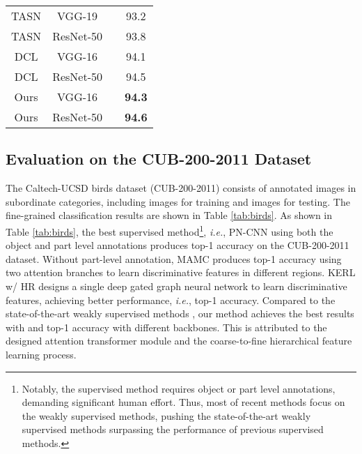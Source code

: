 \documentclass[10pt,twocolumn,letterpaper]{article}
\def\ie{{\em i.e.}}
\begin{document}
\begin{table}[t]
{\begin{tabular}{cccc}
    	 TASN \cite{DBLP:journals/corr/abs-1903-06150}  &    VGG-19    &    &      93.2       \\
    	 TASN \cite{DBLP:journals/corr/abs-1903-06150}  &  ResNet-50   &    &      93.8       \\
    	           DCL \cite{Chen_2019_CVPR}            &    VGG-16    &    &      94.1       \\
    	           DCL \cite{Chen_2019_CVPR}            &  ResNet-50   &    &      94.5       \\
	           \hline
    	                     Ours                       &    VGG-16    &    &  \textbf{94.3}  \\
    	                     Ours                       &  ResNet-50   &    &  \textbf{94.6}  \\ \bottomrule
    \end{tabular}}
\end{table}


\subsection{Evaluation on the CUB-200-2011 Dataset}
The Caltech-UCSD birds dataset (CUB-200-2011) \cite{report-wahcub_200_2011} consists of  annotated images in  subordinate categories, including  images for training and  images for testing. The fine-grained classification results are shown in Table \ref{tab:birds}. As shown in Table \ref{tab:birds}, the best supervised method\footnote{Notably, the supervised method requires object or part level annotations, demanding significant human effort. Thus, most of recent methods focus on the weakly supervised methods, pushing the state-of-the-art weakly supervised methods surpassing the performance of previous supervised methods.}, \ie, PN-CNN \cite{DBLP:journals/corr/BransonHBP14} using both the object and part level annotations produces  top-1 accuracy on the CUB-200-2011 dataset. Without part-level annotation, MAMC \cite{DBLP:conf/eccv/SunYZD18} produces  top-1 accuracy using two attention branches to learn discriminative features in different regions. KERL w/ HR \cite{DBLP:conf/ijcai/ChenLCWL18} designs a single deep gated graph neural network to learn discriminative features, achieving better performance, \ie,  top-1 accuracy. Compared to the state-of-the-art weakly supervised methods \cite{DBLP:conf/ijcai/ChenLCWL18,DBLP:conf/nips/DubeyGRN18,DBLP:conf/eccv/SunYZD18,DBLP:conf/cvpr/WangMD18,Chen_2019_CVPR,DBLP:journals/corr/abs-1903-06150}, our method achieves the best results with  and  top-1 accuracy with different backbones. This is attributed to the designed attention transformer module and the coarse-to-fine hierarchical feature learning process. 
\end{document}
